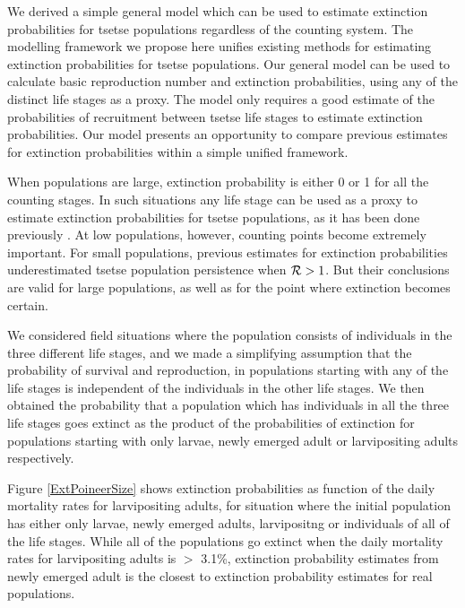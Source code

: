 \documentclass[smallextended]{svjour3}
\begin{document}
We derived a simple general model which can be used to estimate extinction probabilities for tsetse populations regardless of the counting system. The modelling framework we propose here unifies existing methods for estimating extinction probabilities for tsetse populations. Our general model can be used to calculate basic reproduction number and extinction probabilities, using any of the distinct life stages as a proxy. The model only requires a good estimate of the probabilities of recruitment between tsetse life stages to estimate extinction probabilities. Our model presents an opportunity to compare previous estimates for extinction probabilities within a simple unified framework.


When populations are large, extinction probability is either 0 or 1 for all the counting stages. In such situations any life stage can be used as a proxy to estimate extinction probabilities for tsetse populations, as it has been done previously \cite{Hargrove2005a,Kajunguri2019}. At low populations, however, counting points become extremely important. For small populations, previous estimates for extinction probabilities underestimated tsetse population persistence when ${\cal R} > 1$. But their conclusions are valid for large populations, as well as for the point where extinction becomes certain.


We considered field situations where the population consists of individuals in the three different life stages, and we made a simplifying assumption that the probability of survival and reproduction, in populations starting with any of the life stages is independent of the individuals in the other life stages. We then obtained the probability that a population which has individuals in all the three life stages goes extinct as the product of the probabilities of extinction for populations starting with only larvae, newly emerged adult or larvipositing adults respectively. 


Figure \ref{ExtPoineerSize} shows extinction probabilities as function of the daily mortality rates for larvipositing adults, for situation where the initial population has either only larvae, newly emerged adults, larvipositng or individuals of all of the life stages. While all of the populations go extinct when the daily mortality rates for larvipositing adults is $>$ 3.1\%, extinction probability estimates from newly emerged adult is the closest to extinction probability estimates for real populations. 
\end{document}
